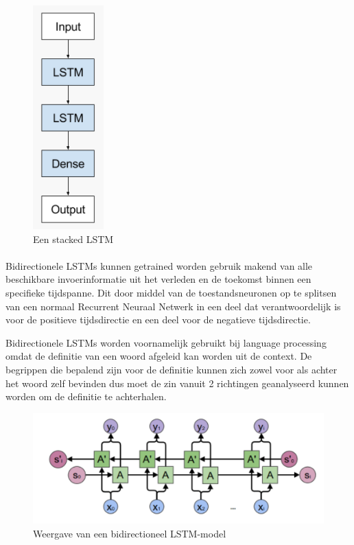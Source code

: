 \begin{figure}
    \centering
    \caption{Een stacked LSTM~\autocite{Brownlee2017b}}
    \label{fig:stacked_lstm}
    \includegraphics[width=0.15\linewidth]{stacked_lstm}
\end{figure}

\paragraph{}

Bidirectionele LSTMs kunnen getrained worden gebruik makend van alle beschikbare invoerinformatie uit het verleden en de toekomst binnen een specifieke tijdspanne. Dit door middel van de toestandsneuronen op te splitsen van een normaal Recurrent Neuraal Netwerk in een deel dat verantwoordelijk is voor de positieve tijdsdirectie en een deel voor de negatieve tijdsdirectie. ~\autocite{Brownlee2017a}

Bidirectionele LSTMs worden voornamelijk gebruikt bij language processing omdat de definitie van een woord afgeleid kan worden uit de context. De begrippen die bepalend zijn voor de definitie kunnen zich zowel voor als achter het woord zelf bevinden dus moet de zin vanuit 2 richtingen geanalyseerd kunnen worden om de definitie te achterhalen.

\begin{figure}
    \centering
    \caption{Weergave van een bidirectioneel LSTM-model~\autocite{Colah2015}}
    \label{fig:bidirectional_lstm}
    \includegraphics[width=0.7\linewidth]{bidirectional_lstm}
\end{figure}

